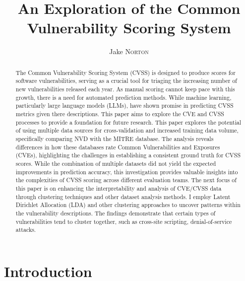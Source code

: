 \documentclass[12pt]{article}
\title{An Exploration of the Common Vulnerability Scoring System}
\author{Jake \textsc{Norton}}
\begin{document}
\maketitle

\begin{abstract}

	The Common Vulnerability Scoring System (CVSS) is designed to produce scores for software
	vulnerabilities, serving as a crucial tool for triaging the increasing number of new
	vulnerabilities released each year. As manual scoring cannot keep pace with this growth, there
	is a need for automated prediction methods. While machine learning, particularly large language
	models (LLMs), have shown promise in predicting CVSS metrics given there descriptions. This
	paper aims to explore the CVE and CVSS processes to provide a foundation for future research.
	This paper explores the potential of using multiple data sources for cross-validation and
	increased training data volume, specifically comparing NVD with the MITRE database. The analysis
	reveals differences in how these databases rate Common Vulnerabilities and Exposures (CVEs),
	highlighting the challenges in establishing a consistent ground truth for CVSS scores. While the
	combination of multiple datasets did not yield the expected improvements in prediction accuracy,
	this investigation provides valuable insights into the complexities of CVSS scoring across
	different evaluation teams. The next focus of this paper is on enhancing the interpretability
	and analysis of CVE/CVSS data through clustering techniques and other dataset analysis methods.
	I employ Latent Dirichlet Allocation (LDA) and other clustering approaches to uncover patterns
	within the vulnerability descriptions. The findings demonstrate that certain types of vulnerabilities
	tend to cluster together, such as cross-site scripting, denial-of-service attacks.
\end{abstract}


\section{Introduction}
\end{document}
